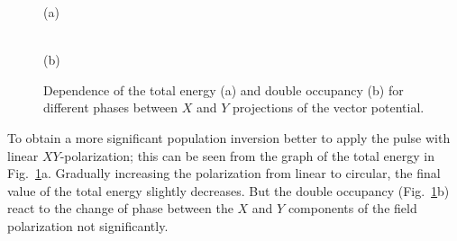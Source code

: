\begin{figure}[h!]
\begin{minipage}[h]{0.5\linewidth}
 (a) \\
\end{minipage}
\hfill
\begin{minipage}[h]{0.5\linewidth}
 \\(b)
\end{minipage}
\caption{Dependence of the total energy (a) and double occupancy (b) for different phases between $X$ and $Y$ projections of the vector potential.}
\label{fig:Etot_3}
\end{figure}

To obtain a more significant population inversion better to apply the pulse with linear $XY$-polarization; this can be seen from the graph of the total energy in Fig.~\ref{fig:Etot_3}a. Gradually increasing the polarization from linear to circular, the final value of the total energy slightly decreases. But the double occupancy (Fig.~\ref{fig:Etot_3}b) react to the change of phase between the $X$ and $Y$ components of the field polarization not significantly.
\FloatBarrier

